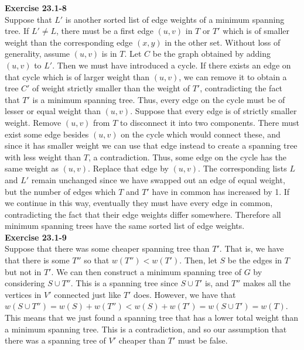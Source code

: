 \documentclass{article}
\begin{document}
\noindent\textbf{Exercise 23.1-8}\\

Suppose that $L'$ is another sorted list of edge weights of a minimum spanning tree.  If $L' \neq L$, there must be a first edge $(u,v)$ in $T$ or $T'$ which is of smaller weight than the corresponding edge $(x,y)$ in the other set.  Without loss of generality, assume $(u,v)$ is in $T$.  Let $C$ be the graph obtained by adding $(u,v)$ to $L'$.  Then we must have introduced a cycle.  If there exists an edge on that cycle which is of larger weight than $(u,v)$, we can remove it to obtain a tree $C'$ of weight strictly smaller than the weight of $T'$, contradicting the fact that $T'$ is a minimum spanning tree.  Thus, every edge on the cycle must be of lesser or equal weight than $(u,v)$.  Suppose that every edge is of strictly smaller weight.  Remove $(u,v)$ from $T$ to disconnect it into two components.  There must exist some edge besides $(u,v)$ on the cycle which would connect these, and since it has smaller weight we can use that edge instead to create a spanning tree with less weight than $T$, a contradiction.  Thus, some edge on the cycle has the same weight as $(u,v)$.  Replace that edge by $(u,v)$.  The corresponding lists $L$ and $L'$ remain unchanged since we have swapped out an edge of equal weight, but the number of edges which $T$ and $T'$ have in common has increased by 1.  If we continue in this way, eventually they must have every edge in common, contradicting the fact that their edge weights differ somewhere.  Therefore all minimum spanning trees have the same sorted list of edge weights. \\

\noindent\textbf{Exercise 23.1-9}\\

Suppose that there was some cheaper spanning tree than $T'$. That is, we have that there is some $T''$ so that $w(T'')<w(T')$. Then, let $S$ be the edges in $T$ but not in $T'$. We can then construct a minimum spanning tree of $G$ by considering $S \cup T''$. This is a spanning tree since $S \cup T'$ is, and $T''$ makes all the vertices in $V'$ connected just like $T'$ does. However, we have that $w(S\cup T'') = w(S) + w(T'')  <w(S) + w(T') = w(S \cup T') = w(T)$. This means that we just found a spanning tree that has a lower total weight than a minimum spanning tree. This is a contradiction, and so our assumption that there was a spanning tree of $V'$ cheaper than $T'$ must be false.\\
\end{document}
